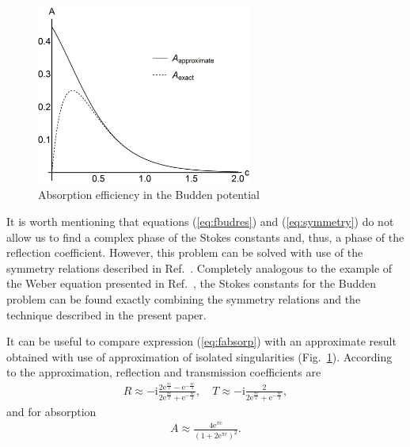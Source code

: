 \documentclass{ws-m3as}
\def\rmi{\mathrm{i}}
\def\rme{\mathrm{e}}
\def\mytextwidth{0.63\textwidth}
\newcommand\eref[1]{(\ref{#1})}
\newcommand\fref[1]{Fig.~\ref{#1}}
\begin{document}
\begin{figure}
\centering
\noindent
\includegraphics[width=\mytextwidth]{absorp.jpg}
\vspace*{8pt}
\caption{Absorption efficiency in the Budden potential}
\label{fig:absorp}
\end{figure} 

It is worth mentioning that equations \eref{eq:fbudres} and \eref{eq:symmetry} do not allow us
to find a complex phase of the Stokes constants and, thus, a phase of the reflection coefficient.
However, this problem can be solved with use of the symmetry relations described in 
Ref.~. Completely analogous to the example of the Weber equation presented in
Ref.~, the Stokes constants for the Budden problem can be found exactly combining
the symmetry relations and the technique described in the present paper.

It can be useful to compare expression \eref{eq:fabsorp} with an approximate result 
obtained with use of approximation of isolated singularities (\fref{fig:absorp}). According to the 
approximation\cite{rwbook}, reflection and transmission coefficients are
\begin{eqnarray}
R \approx 
-\rmi \frac{2 \rme^{\frac{\pi c}{2}} - \rme^{-\frac{\pi c}{2}}}{2 \rme^{\frac{\pi c}{2}} + \rme^{-\frac{\pi c}{2}}},
\quad
T \approx -\rmi \frac{2}{2 \rme^{\frac{\pi c}{2}} + \rme^{-\frac{\pi c}{2}}},
\end{eqnarray}
and for absorption
\begin{eqnarray}
A \approx \frac{4 \rme^{\pi c}}{(1 + 2 \rme^{\pi c})^2}.
\label{eq:aisabsorp}
\end{eqnarray}
\end{document}
